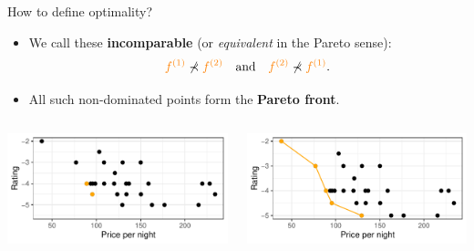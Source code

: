 \documentclass[11pt,compress,t,notes=noshow,xcolor=table]{beamer}
\begin{document}
\begin{vbframe}{How to define optimality?}


\begin{itemize}\setlength{\itemsep}{0.1em}
  \item We call these \textbf{incomparable} (or \emph{equivalent} in the Pareto sense):
\[
\textcolor{orange}{f^{(1)}} 
   \not\prec 
\textcolor{orange}{f^{(2)}} 
\quad\text{and}\quad
\textcolor{orange}{f^{(2)}} 
   \not\prec 
\textcolor{orange}{f^{(1)}}.
\]
\item All such non-dominated points form the \textbf{Pareto front}.
\end{itemize}

\bigskip
\begin{columns}[c]
        \includegraphics[width=\textwidth]{figure_man/expedia-4-1.pdf}
        
        \includegraphics[width=\textwidth]{figure_man/expedia-5-1.pdf}
    \end{columns}

\end{vbframe}
\end{document}
